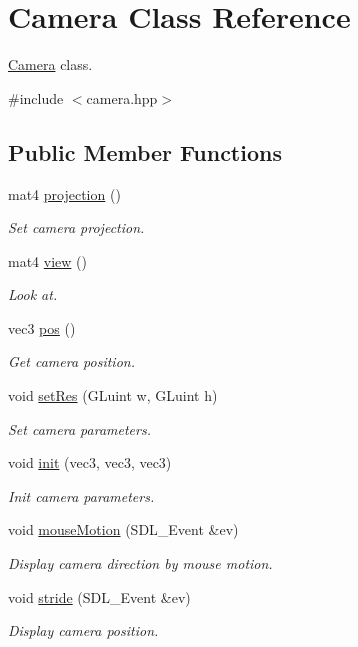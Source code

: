 \hypertarget{classCamera}{}\section{Camera Class Reference}
\label{classCamera}


\mbox{\hyperlink{classCamera}{Camera}} class.  




{\ttfamily \#include $<$camera.\+hpp$>$}

\subsection*{Public Member Functions}
\begin{DoxyCompactItemize}
\item 
mat4 \mbox{\hyperlink{classCamera_a59690505905b7a1446e4e8de09f00916}{projection}} ()
\begin{DoxyCompactList}\small\item\em Set camera projection. \end{DoxyCompactList}\item 
mat4 \mbox{\hyperlink{classCamera_a8e6842eed5a91392ffbbf05a5c086a36}{view}} ()
\begin{DoxyCompactList}\small\item\em Look at. \end{DoxyCompactList}\item 
vec3 \mbox{\hyperlink{classCamera_ac28fec027fd3779e273a5bbd9439bfb5}{pos}} ()
\begin{DoxyCompactList}\small\item\em Get camera position. \end{DoxyCompactList}\item 
void \mbox{\hyperlink{classCamera_aa14b536a20f27aff0b2041d9d5fbe56d}{set\+Res}} (G\+Luint w, G\+Luint h)
\begin{DoxyCompactList}\small\item\em Set camera parameters. \end{DoxyCompactList}\item 
void \mbox{\hyperlink{classCamera_a447d8a9703b42a4a41b40f6e1a0e888a}{init}} (vec3, vec3, vec3)
\begin{DoxyCompactList}\small\item\em Init camera parameters. \end{DoxyCompactList}\item 
void \mbox{\hyperlink{classCamera_a32764e00a0e9359a546e7b68cdaa6aa1}{mouse\+Motion}} (S\+D\+L\+\_\+\+Event \&ev)
\begin{DoxyCompactList}\small\item\em Display camera direction by mouse motion. \end{DoxyCompactList}\item 
void \mbox{\hyperlink{classCamera_a82f4dae580a39549995aa1e91394c1b8}{stride}} (S\+D\+L\+\_\+\+Event \&ev)
\begin{DoxyCompactList}\small\item\em Display camera position. \end{DoxyCompactList}\end{DoxyCompactItemize}
